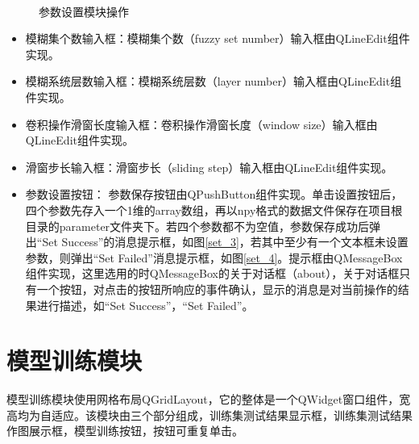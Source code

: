\documentclass[cn,11pt,chinese]{elegantbook}
\begin{document}
\begin{figure}
{	}
	\\
	\caption{参数设置模块操作}
	\label{set}
\end{figure}

\begin{itemize}
	\item 模糊集个数输入框：模糊集个数（fuzzy set number）输入框由QLineEdit组件实现。
	\item 模糊系统层数输入框：模糊系统层数（layer number）输入框由QLineEdit组件实现。
	\item 卷积操作滑窗长度输入框：卷积操作滑窗长度（window size）输入框由QLineEdit组件实现。
	\item 滑窗步长输入框：滑窗步长（sliding step）输入框由QLineEdit组件实现。
	\item 参数设置按钮： 参数保存按钮由QPushButton组件实现。单击设置按钮后，四个参数先存入一个1维的array数组，再以npy格式的数据文件保存在项目根目录的parameter文件夹下。若四个参数都不为空值，参数保存成功后弹出“Set Success”的消息提示框，如图\ref{set_3}，若其中至少有一个文本框未设置参数，则弹出“Set Failed”消息提示框，如图\ref{set_4}。提示框由QMessageBox组件实现，这里选用的时QMessageBox的关于对话框（about），关于对话框只有一个按钮，对点击的按钮所响应的事件确认，显示的消息是对当前操作的结果进行描述，如“Set Success”，“Set Failed”。
\end{itemize}

\section{模型训练模块}

模型训练模块使用网格布局QGridLayout，它的整体是一个QWidget窗口组件，宽高均为自适应。该模块由三个部分组成，训练集测试结果显示框，训练集测试结果作图展示框，模型训练按钮，按钮可重复单击。
\end{document}
